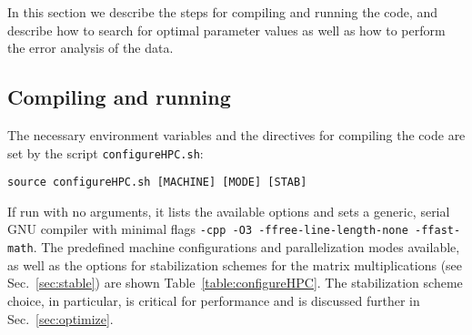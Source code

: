 


In this section we describe the steps for compiling and running the code, and describe how to search for optimal parameter values as well as how to perform the error analysis of the data.

\subsection{Compiling and running}
\label{sec:compilation}

The necessary environment variables and the directives for compiling the code are set by the script \texttt{configureHPC.sh}:
\begin{lstlisting}[style=bash]
source configureHPC.sh [MACHINE] [MODE] [STAB]
\end{lstlisting}
If run with no arguments, it lists the available options and sets a generic, serial GNU compiler with minimal flags \texttt{-cpp -O3 -ffree-line-length-none -ffast-math}. The predefined machine configurations and parallelization modes available, as well as the options for stabilization schemes for the matrix multiplications (see Sec.~\ref{sec:stable}) are shown Table~\ref{table:configureHPC}. The stabilization scheme choice, in particular, is critical for performance and is discussed further in Sec.~\ref{sec:optimize}.

